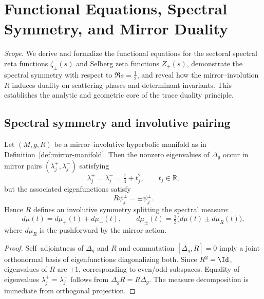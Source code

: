 \section{Functional Equations, Spectral Symmetry, and Mirror Duality}
\label{sec:ch6-part4-functional-eq} \relax \hspace{0pt}
\FlowBreaker
\noindent\emph{Scope.} We derive and formalize the functional equations for the sectoral spectral zeta functions $\zeta_\pm(s)$ and Selberg zeta functions $Z_\pm(s)$, demonstrate the spectral symmetry with respect to $\Re s = \tfrac{1}{2}$, and reveal how the mirror–involution $R$ induces duality on scattering phases and determinant invariants. This establishes the analytic and geometric core of the trace duality principle.  %


\subsection{Spectral symmetry and involutive pairing}
\label{subsec:ch6-part4-spectral-symmetry} \relax \hspace{0pt}
\begin{theorem}
\label{thm:spectral-pairing}
Let $(M,g,R)$ be a mirror–involutive hyperbolic manifold as in Definition~\ref{def:mirror-manifold}. Then the nonzero eigenvalues of $\Delta_g$ occur in mirror pairs $(\lambda_j^+, \lambda_j^-)$ satisfying
\[
\lambda_j^+ = \lambda_j^- = \tfrac14 + t_j^2,\qquad t_j\in\mathbb R,
\]
but the associated eigenfunctions satisfy
\[
R\psi_j^\pm = \pm \psi_j^\pm.
\]
Hence $R$ defines an involutive symmetry splitting the spectral measure:
\[
d\mu(t) = d\mu_+(t) + d\mu_-(t),\qquad 
d\mu_\pm(t)=\tfrac12\big(d\mu(t)\pm d\mu_R(t)\big),
\]
where $d\mu_R$ is the pushforward by the mirror action.  %
\end{theorem}

\begin{proof}
Self–adjointness of $\Delta_g$ and $R$ and commutation $[\Delta_g,R]=0$ imply a joint orthonormal basis of eigenfunctions diagonalizing both. Since $R^2=\Id$, eigenvalues of $R$ are $\pm1$, corresponding to even/odd subspaces. Equality of eigenvalues $\lambda_j^+=\lambda_j^-$ follows from $\Delta_gR=R\Delta_g$. The measure decomposition is immediate from orthogonal projection. %
\end{proof}

